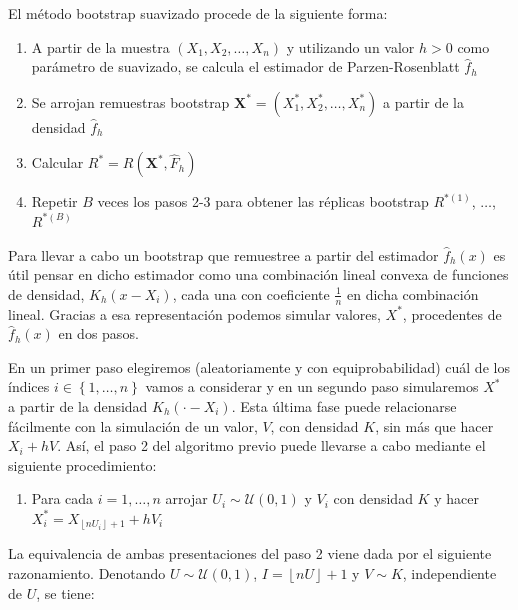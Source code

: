 \documentclass[]{book}
\providecommand{\tightlist}{%
  \setlength{\itemsep}{0pt}\setlength{\parskip}{0pt}}
\theoremstyle{definition}
\theoremstyle{definition}
\theoremstyle{definition}
\theoremstyle{remark}
\begin{document}
El método bootstrap suavizado procede de la siguiente forma:

\begin{enumerate}
\def\labelenumi{\arabic{enumi}.}
\item
  A partir de la muestra \(\left( X_1,X_2,\ldots ,X_n \right)\) y
  utilizando un valor \(h>0\) como parámetro de suavizado, se calcula el
  estimador de Parzen-Rosenblatt \(\hat{f}_{h}\)
\item
  Se arrojan remuestras bootstrap
  \(\mathbf{X}^{\ast}=\left( X_1^{\ast},X_2^{\ast},\ldots ,X_n^{\ast} \right)\)
  a partir de la densidad \(\hat{f}_{h}\)
\item
  Calcular \(R^{\ast}=R\left( \mathbf{X}^{\ast},\hat{F}_{h} \right)\)
\item
  Repetir \(B\) veces los pasos 2-3 para obtener las réplicas bootstrap
  \(R^{\ast (1)}\), \(\ldots\), \(R^{\ast (B)}\)
\end{enumerate}

Para llevar a cabo un bootstrap que remuestree a partir del estimador
\(\hat{f}_{h}\left( x \right)\) es útil pensar en dicho estimador como
una combinación lineal convexa de funciones de densidad,
\(K_{h}\left( x-X_i \right)\), cada una con coeficiente \(\frac{1}{n}\)
en dicha combinación lineal. Gracias a esa representación podemos
simular valores, \(X^{\ast}\), procedentes de
\(\hat{f}_{h}\left( x \right)\) en dos pasos.

En un primer paso elegiremos (aleatoriamente y con equiprobabilidad)
cuál de los índices \(i\in \left\{ 1,\ldots ,n\right\}\) vamos a
considerar y en un segundo paso simularemos \(X^{\ast}\) a partir de la
densidad \(K_{h}\left( \cdot -X_i \right)\). Esta última fase puede
relacionarse fácilmente con la simulación de un valor, \(V\), con
densidad \(K\), sin más que hacer \(X_i+hV\). Así, el paso 2 del
algoritmo previo puede llevarse a cabo mediante el siguiente
procedimiento:

\begin{enumerate}
\def\labelenumi{\arabic{enumi}.}
\setcounter{enumi}{1}
\tightlist
\item
  Para cada \(i=1,\ldots ,n\) arrojar
  \(U_i\sim \mathcal{U}\left( 0,1 \right)\) y \(V_i\) con densidad \(K\)
  y hacer \(X_i^{\ast}=X_{\left\lfloor nU_i\right\rfloor +1}+hV_i\)
\end{enumerate}

La equivalencia de ambas presentaciones del paso 2 viene dada por el
siguiente razonamiento. Denotando
\(U\sim \mathcal{U}\left( 0,1 \right)\),
\(I=\left\lfloor nU\right\rfloor +1\) y \(V\sim K\), independiente de
\(U\), se tiene:
\end{document}
